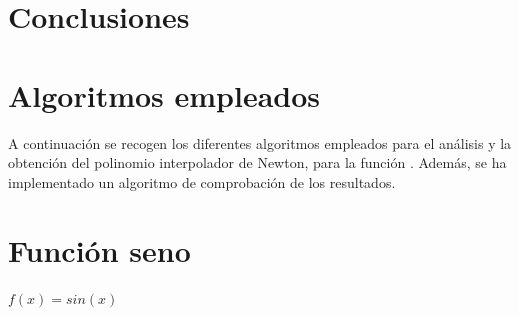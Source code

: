 \documentclass[spanish,a4paper,11pt,twoside]{report}
\begin{document}


\chapter{Conclusiones}
\label{chapter:conclusiones}




\newpage{\pagestyle{empty}\cleardoublepage}
\thispagestyle{empty}
\begin{appendix}

\chapter{Algoritmos empleados}
A continuación se recogen los diferentes algoritmos empleados para el análisis y la obtención del polinomio interpolador de Newton, para la función . Además, se ha implementado un algoritmo de comprobación de los resultados.
\label{appendix:1}



\chapter{Función seno}
\label{appendix:2}



\end{appendix}





\nocite{*}$f(x)=sin(x)$

\end{document}
